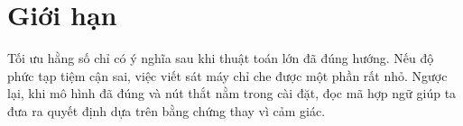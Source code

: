 \documentclass[11pt]{article}
\begin{document}
\section{Giới hạn}

Tối ưu hằng số chỉ có ý nghĩa sau khi thuật toán lớn đã đúng hướng. Nếu độ
phức tạp tiệm cận sai, việc viết sát máy chỉ che được một phần rất nhỏ. Ngược
lại, khi mô hình đã đúng và nút thắt nằm trong cài đặt, đọc mã hợp ngữ giúp
ta đưa ra quyết định dựa trên bằng chứng thay vì cảm giác.
\end{document}

